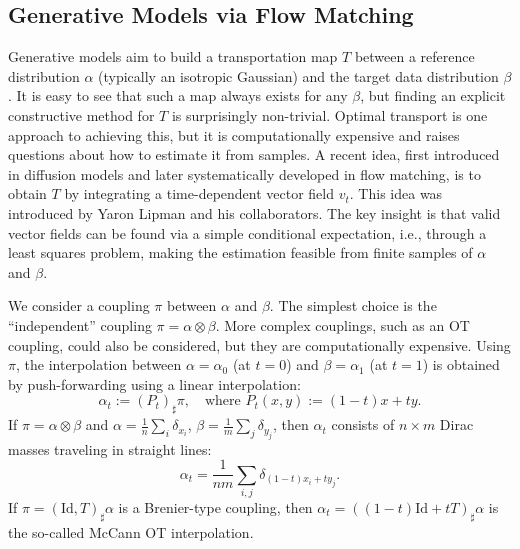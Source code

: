 \subsection{Generative Models via Flow Matching}

Generative models aim to build a transportation map $T$ between a reference distribution $\alpha$ (typically an isotropic Gaussian) and the target data distribution $\beta$. It is easy to see that such a map always exists for any $\beta$, but finding an explicit constructive method for $T$ is surprisingly non-trivial. 
%
Optimal transport is one approach to achieving this, but it is computationally expensive and raises questions about how to estimate it from samples. A recent idea, first introduced in diffusion models and later systematically developed in flow matching, is to obtain $T$ by integrating a time-dependent vector field $v_t$. This idea was introduced by Yaron Lipman and his collaborators. The key insight is that valid vector fields can be found via a simple conditional expectation, i.e., through a least squares problem, making the estimation feasible from finite samples of $\alpha$ and $\beta$.

We consider a coupling $\pi$ between $\alpha$ and $\beta$. The simplest choice is the ``independent'' coupling $\pi = \alpha \otimes \beta$. More complex couplings, such as an OT coupling, could also be considered, but they are computationally expensive. Using $\pi$, the interpolation between $\alpha = \alpha_0$ (at $t=0$) and $\beta = \alpha_1$ (at $t=1$) is obtained by push-forwarding using a linear interpolation:
\begin{equation}
    \alpha_t := (P_t)_\sharp \pi, \quad \text{where } P_t(x, y) := (1-t)x + ty. \label{eq:interp-coupling}
\end{equation}
If $\pi = \alpha \otimes \beta$ and $\alpha = \frac{1}{n} \sum_i \delta_{x_i}$, $\beta = \frac{1}{m} \sum_j \delta_{y_j}$, then $\alpha_t$ consists of $n \times m$ Dirac masses traveling in straight lines:
\begin{equation*}
    \alpha_t = \frac{1}{nm} \sum_{i,j} \delta_{(1-t)x_i + ty_j}.
\end{equation*}
If $\pi = (\mathrm{Id}, T)_\sharp \alpha$ is a Brenier-type coupling, then $\alpha_t = ((1-t)\mathrm{Id} + tT)_\sharp \alpha$ is the so-called McCann OT interpolation.

